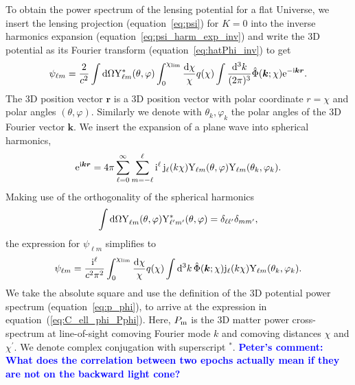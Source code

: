 \documentclass[fleqn,usenatbib]{mnras} %
\renewcommand{\vec}{\bm}
\newcommand{\mk}[1]{{\bf\textcolor{blue}{#1}}}
\begin{document}
\begin{appendix}
To obtain the power spectrum of the lensing potential for a flat Universe, 
we insert the lensing projection (equation~\ref{eq:psi}) for $K=0$ into the
inverse harmonics expansion (equation~\ref{eq:psi_harm_exp_inv}) and write the 3D potential
as its Fourier transform (equation~\ref{eq:hatPhi_inv}) to get
%
\begin{equation}
  \psi_{\ell m} = \frac 2 {c^2} \int {\rm d} \Omega {\rm Y}^\ast_{\ell m}(\theta, \varphi)
    \int_0^{\chi_{\rm lim}} \frac{{\rm d}\chi}{\chi} q(\chi) \int \frac{{\rm d}^3 k}{(2\pi)^3} \hat \Phi(\vec k; \chi) {\rm e}^{-{\rm i} \vec k \vec r}.
\end{equation}
%
The 3D position vector $\vec r$ is a 3D position vector with polar coordinate
$r = \chi$ and polar angles $(\theta, \varphi)$. Similarly we denote with
$\theta_k, \varphi_k$ the polar angles of the 3D Fourier vector $\vec k$. We
insert the expansion of a plane wave into spherical harmonics,
%
%
\begin{equation}
  {\rm e}^{{\rm i} \vec k \vec r} = 4 \pi \sum_{\ell=0}^{\infty} \sum_{m=-\ell}^{\ell}
    {\rm i}^\ell \, {\rm j}_\ell(k \chi)
    {\rm Y}_{\ell m}(\theta, \varphi) {\rm Y}_{\ell m}(\theta_k, \varphi_k) .
  \label{eq:wave_exp}
\end{equation}
%
Making use of the orthogonality of the spherical harmonics
%
%
\begin{equation}
  \int {\rm d} \Omega {\rm Y}^{}_{\ell m}(\theta, \varphi) {\rm Y}^\ast_{\ell^\prime m^\prime}(\theta, \varphi) = \delta_{\ell \ell^\prime} \delta_{m m^\prime},
  \label{eq:Yellm_ortho}
\end{equation}
%
the expression for $\psi_{\ell m}$ simplifies to
%
\begin{equation}
  \psi_{\ell m} = \frac {{\rm i}^\ell}{c^2 \pi^2} \int_0^{\chi_{\rm lim}} \frac{{\rm d}\chi}{\chi} q(\chi) \int {\rm d}^3 k \,
    \hat \Phi(\vec k; \chi) {\rm j}_\ell(k \chi) {\rm Y}_{\ell m}(\theta_k, \varphi_k).
  \label{eq:psi_ellm}
\end{equation}
%
We take the absolute square and use the definition of the 3D potential power spectrum (equation~\ref{eq:p_phi}),
to arrive at the expression in equation~(\ref{eq:C_ell_phi_Pphi}).
Here, $P_{\rm m}$ is the 3D matter power cross-spectrum at line-of-sight comoving
Fourier mode $k$ and comoving distances $\chi$ and $\chi^\prime$. We denote
complex conjugation with superscript $^\ast$.
\mk{Peter's comment: What does the correlation between two epochs actually mean if they
are not on the backward light cone?}


\end{appendix}
\end{document}
